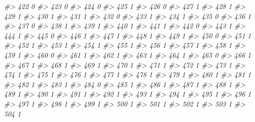 \documentclass[]{book}
\newenvironment{Shaded}{\begin{snugshade}}{\end{snugshade}}
\newcommand{\CommentTok}[1]{\textcolor[rgb]{0.56,0.35,0.01}{\textit{#1}}}
\begin{document}
\begin{Shaded}
\begin{Highlighting}[]
\CommentTok{#> 422           0}
\CommentTok{#> 423           0}
\CommentTok{#> 424           0}
\CommentTok{#> 425           1}
\CommentTok{#> 426           0}
\CommentTok{#> 427           1}
\CommentTok{#> 428           1}
\CommentTok{#> 429           1}
\CommentTok{#> 430           1}
\CommentTok{#> 431           1}
\CommentTok{#> 432           0}
\CommentTok{#> 433           1}
\CommentTok{#> 434           1}
\CommentTok{#> 435           0}
\CommentTok{#> 436           1}
\CommentTok{#> 437           0}
\CommentTok{#> 438           1}
\CommentTok{#> 439           1}
\CommentTok{#> 440           1}
\CommentTok{#> 441           1}
\CommentTok{#> 442           0}
\CommentTok{#> 443           1}
\CommentTok{#> 444           1}
\CommentTok{#> 445           0}
\CommentTok{#> 446           1}
\CommentTok{#> 447           1}
\CommentTok{#> 448           1}
\CommentTok{#> 449           1}
\CommentTok{#> 450           0}
\CommentTok{#> 451           1}
\CommentTok{#> 452           1}
\CommentTok{#> 453           1}
\CommentTok{#> 454           1}
\CommentTok{#> 455           1}
\CommentTok{#> 456           1}
\CommentTok{#> 457           1}
\CommentTok{#> 458           1}
\CommentTok{#> 459           1}
\CommentTok{#> 460           0}
\CommentTok{#> 461           1}
\CommentTok{#> 462           1}
\CommentTok{#> 463           1}
\CommentTok{#> 464           1}
\CommentTok{#> 465           0}
\CommentTok{#> 466           1}
\CommentTok{#> 467           1}
\CommentTok{#> 468           1}
\CommentTok{#> 469           1}
\CommentTok{#> 470           1}
\CommentTok{#> 471           1}
\CommentTok{#> 472           1}
\CommentTok{#> 473           1}
\CommentTok{#> 474           1}
\CommentTok{#> 475           1}
\CommentTok{#> 476           1}
\CommentTok{#> 477           1}
\CommentTok{#> 478           1}
\CommentTok{#> 479           1}
\CommentTok{#> 480           1}
\CommentTok{#> 481           1}
\CommentTok{#> 482           1}
\CommentTok{#> 483           1}
\CommentTok{#> 484           0}
\CommentTok{#> 485           1}
\CommentTok{#> 486           1}
\CommentTok{#> 487           1}
\CommentTok{#> 488           1}
\CommentTok{#> 489           1}
\CommentTok{#> 490           1}
\CommentTok{#> 491           1}
\CommentTok{#> 492           1}
\CommentTok{#> 493           1}
\CommentTok{#> 494           1}
\CommentTok{#> 495           1}
\CommentTok{#> 496           1}
\CommentTok{#> 497           1}
\CommentTok{#> 498           1}
\CommentTok{#> 499           1}
\CommentTok{#> 500           1}
\CommentTok{#> 501           1}
\CommentTok{#> 502           1}
\CommentTok{#> 503           1}
\CommentTok{#> 504           1}
\end{Highlighting}
\end{Shaded}
\end{document}
